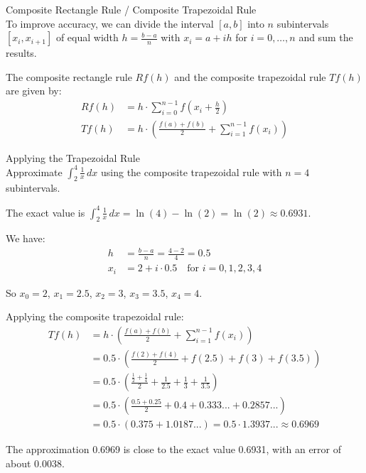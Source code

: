 \begin{definition}{Composite Rectangle Rule / Composite Trapezoidal Rule}\\
To improve accuracy, we can divide the interval $[a,b]$ into $n$ subintervals $[x_i, x_{i+1}]$ of equal width $h = \frac{b-a}{n}$ with $x_i = a + ih$ for $i = 0, \ldots, n$ and sum the results.

The composite rectangle rule $Rf(h)$ and the composite trapezoidal rule $Tf(h)$ are given by:
\begin{align*}
Rf(h) &= h \cdot \sum_{i=0}^{n-1} f\left(x_i + \frac{h}{2}\right)\\
Tf(h) &= h \cdot \left(\frac{f(a) + f(b)}{2} + \sum_{i=1}^{n-1} f(x_i)\right)
\end{align*}
\end{definition}

\begin{example2}{Applying the Trapezoidal Rule}\\
Approximate $\int_2^4 \frac{1}{x} \, dx$ using the composite trapezoidal rule with $n = 4$ subintervals.

The exact value is $\int_2^4 \frac{1}{x} \, dx = \ln(4) - \ln(2) = \ln(2) \approx 0.6931$.

We have:
\begin{align*}
h &= \frac{b-a}{n} = \frac{4-2}{4} = 0.5\\
x_i &= 2 + i \cdot 0.5 \quad \text{for } i = 0, 1, 2, 3, 4
\end{align*}

So $x_0 = 2$, $x_1 = 2.5$, $x_2 = 3$, $x_3 = 3.5$, $x_4 = 4$.

Applying the composite trapezoidal rule:
\begin{align*}
Tf(h) &= h \cdot \left(\frac{f(a) + f(b)}{2} + \sum_{i=1}^{n-1} f(x_i)\right)\\
&= 0.5 \cdot \left(\frac{f(2) + f(4)}{2} + f(2.5) + f(3) + f(3.5)\right)\\
&= 0.5 \cdot \left(\frac{\frac{1}{2} + \frac{1}{4}}{2} + \frac{1}{2.5} + \frac{1}{3} + \frac{1}{3.5}\right)\\
&= 0.5 \cdot \left(\frac{0.5 + 0.25}{2} + 0.4 + 0.333... + 0.2857...\right)\\
&= 0.5 \cdot (0.375 + 1.0187...) = 0.5 \cdot 1.3937... \approx 0.6969
\end{align*}

The approximation 0.6969 is close to the exact value 0.6931, with an error of about 0.0038.
\end{example2}

